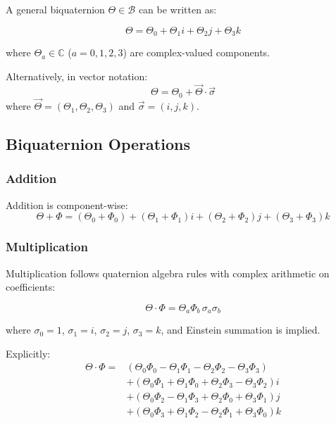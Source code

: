 A general biquaternion $\Theta \in \mathcal{B}$ can be written as:

\begin{equation}
\label{eq:canonical:biquat_general}
\Theta = \Theta_0 + \Theta_1 i + \Theta_2 j + \Theta_3 k
\end{equation}

where $\Theta_a \in \mathbb{C}$ ($a = 0,1,2,3$) are complex-valued components.

Alternatively, in vector notation:
\begin{equation}
\Theta = \Theta_0 + \vec{\Theta} \cdot \vec{\sigma}
\end{equation}
where $\vec{\Theta} = (\Theta_1, \Theta_2, \Theta_3)$ and $\vec{\sigma} = (i, j, k)$.

\subsection{Biquaternion Operations}

\subsubsection{Addition}

Addition is component-wise:
\begin{equation}
\Theta + \Phi = (\Theta_0 + \Phi_0) + (\Theta_1 + \Phi_1)i + (\Theta_2 + \Phi_2)j + (\Theta_3 + \Phi_3)k
\end{equation}

\subsubsection{Multiplication}

Multiplication follows quaternion algebra rules with complex arithmetic on coefficients:

\begin{equation}
\Theta \cdot \Phi = \Theta_a \Phi_b \, \sigma_a \sigma_b
\end{equation}

where $\sigma_0 = 1$, $\sigma_1 = i$, $\sigma_2 = j$, $\sigma_3 = k$, and Einstein summation is implied.

Explicitly:
\begin{align}
\Theta \cdot \Phi = &(\Theta_0\Phi_0 - \Theta_1\Phi_1 - \Theta_2\Phi_2 - \Theta_3\Phi_3) \\
&+ (\Theta_0\Phi_1 + \Theta_1\Phi_0 + \Theta_2\Phi_3 - \Theta_3\Phi_2)i \\
&+ (\Theta_0\Phi_2 - \Theta_1\Phi_3 + \Theta_2\Phi_0 + \Theta_3\Phi_1)j \\
&+ (\Theta_0\Phi_3 + \Theta_1\Phi_2 - \Theta_2\Phi_1 + \Theta_3\Phi_0)k
\end{align}

